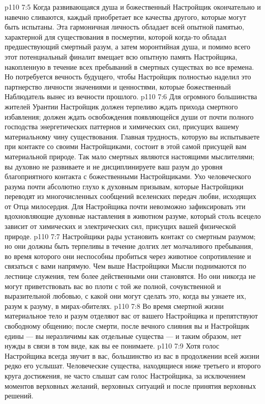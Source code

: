 \vs p110 7:5 Когда развивающаяся душа и божественный Настройщик окончательно и навечно сливаются, каждый приобретает все качества другого, которые могут быть испытаны. Эта гармоничная личность обладает всей опытной памятью, характерной для существования в посмертии, которой когда\hyp{}то обладал предшествующий смертный разум, а затем моронтийная душа, и помимо всего этот потенциальный финалит вмещает всю опытную память Настройщика, накопленную в течение всех пребываний в смертных существах во все времена. Но потребуется вечность будущего, чтобы Настройщик полностью наделил это партнерство личности значениями и ценностями, которые божественный Наблюдатель вынес из вечности прошлого.
\vs p110 7:6 \pc Для огромного большинства жителей Урантии Настройщик должен терпеливо ждать прихода смертного избавления; должен ждать освобождения появляющейся души от почти полного господства энергетических паттернов и химических сил, присущих вашему материальному чину существования. Главная трудность, которую вы испытываете при контакте со своими Настройщиками, состоит в этой самой присущей вам материальной природе. Так мало смертных являются настоящими мыслителями; вы духовно не развиваете и не дисциплинируете ваш разум до уровня благоприятного контакта с божественными Настройщиками. Ухо человеческого разума почти абсолютно глухо к духовным призывам, которые Настройщики переводят из многочисленных сообщений вселенских передач любви, исходящих от Отца милосердия. Для Настройщика почти невозможно зафиксировать эти вдохновляющие духовные наставления в животном разуме, который столь всецело зависит от химических и электрических сил, присущих вашей физической природе.
\vs p110 7:7 Настройщики рады установить контакт со смертным разумом; но они должны быть терпеливы в течение долгих лет молчаливого пребывания, во время которого они неспособны пробиться через животное сопротивление и связаться с вами напрямую. Чем выше Настройщики Мысли поднимаются по лестнице служения, тем более действенными они становятся. Но они никогда не могут приветствовать вас во плоти с той же полной, сочувственной и выразительной любовью, с какой они могут сделать это, когда вы узнаете их, разум к разуму, в мирах\hyp{}обителях.
\vs p110 7:8 Во время смертной жизни материальное тело и разум отделяют вас от вашего Настройщика и препятствуют свободному общению; после смерти, после вечного слияния вы и Настройщик едины --- вы неразличимы как отдельные существа --- и таким образом, нет нужды в связи в том виде, как вы ее понимаете.
\vs p110 7:9 Хотя голос Настройщика всегда звучит в вас, большинство из вас в продолжении всей жизни редко его услышат. Человеческие существа, находящиеся ниже третьего и второго круга достижения, не часто слышат сам голос Настройщика, за исключением моментов верховных желаний, верховных ситуаций и после принятия верховных решений.
